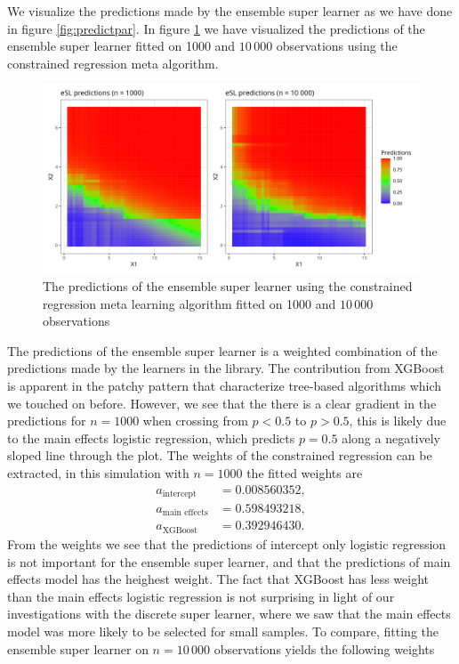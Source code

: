 \documentclass[./main.tex]{subfiles}
\begin{document}
We visualize the predictions made by the ensemble super learner as we have done in figure \ref{fig:predictpar}. In figure \ref{fig:esl_preds_quad_prog} we have visualized the predictions of the ensemble super learner fitted on 1000 and $ 10\,000 $ observations using the constrained regression meta algorithm.
\begin{figure}[H]
    \centering
    \includegraphics[width=\textwidth]{figures/esl_preds_par.png}
    \caption{The predictions of the ensemble super learner using the constrained regression meta learning algorithm fitted on 1000 and $ 10\,000 $ observations}
    \label{fig:esl_preds_quad_prog}
\end{figure}
The predictions of the ensemble super learner is a weighted combination of the predictions made by the learners in the library. The contribution from XGBoost is apparent in the patchy pattern that characterize tree-based algorithms which we touched on before. However, we see that the there is a clear gradient in the predictions for $ n = 1000 $ when crossing from $ p < 0.5 $ to $ p > 0.5 $, this is likely due to the main effects logistic regression, which predicts $ p = 0.5 $ along a negatively sloped line through the plot. The weights of the constrained regression can be extracted, in this simulation with $ n = 1000 $ the fitted weights are
\begin{align*}
    a_{\text{intercept}} &=0.008560352, \\
    a_{\text{main effects}} &= 0.598493218, \\
    a_{\text{XGBoost}} &= 0.392946430.
\end{align*}
From the weights we see that the predictions of intercept only logistic regression is not important for the ensemble super learner, and that the predictions of main effects model has the heighest weight. The fact that XGBoost has less weight than the main effects logistic regression is not surprising in light of our investigations with the discrete super learner, where we saw that the main effects model was more likely to be selected for small samples. To compare, fitting the ensemble super learner on $ n = 10\,000 $ observations yields the following weights
\end{document}
